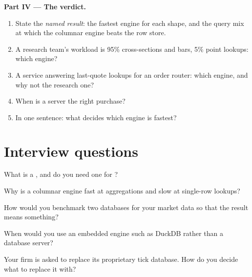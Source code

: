 \begin{problem}
\medskip\noindent\textbf{Part IV --- The verdict.}
\begin{enumerate}[resume]
\item State the \emph{named result}: the fastest engine for each shape, and the query mix at which the columnar engine beats the
row store.
\item A research team's workload is 95\% cross-sections and bars, 5\% point lookups: which engine?
\item A service answering last-quote lookups for an order router: which engine, and why not the research one?
\item When is a  server the right purchase?
\item In one sentence: what decides which engine is fastest?
\end{enumerate}
\end{problem}

\section{Interview questions}

\begin{interviewq}\label{iq:pl:time-series-databases-and-the-alternatives:1}
What is a , and do you need one for ?
\end{interviewq}

\begin{interviewq}\label{iq:pl:time-series-databases-and-the-alternatives:2}
Why is a columnar engine fast at aggregations and slow at single-row lookups?
\end{interviewq}

\begin{interviewq}\label{iq:pl:time-series-databases-and-the-alternatives:3}
How would you benchmark two databases for your market data so that the result means something?
\end{interviewq}

\begin{interviewq}\label{iq:pl:time-series-databases-and-the-alternatives:4}
When would you use an embedded engine such as DuckDB rather than a database server?
\end{interviewq}

\begin{interviewq}\label{iq:pl:time-series-databases-and-the-alternatives:5}
Your firm is asked to replace its proprietary tick database. How do you decide what to replace it with?
\end{interviewq}

